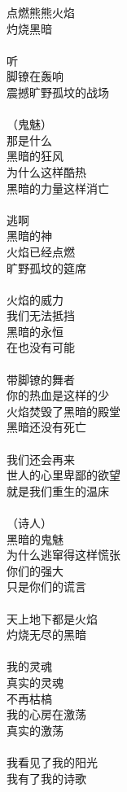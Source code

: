 点燃熊熊火焰\\
灼烧黑暗\\
\\
听\\
脚镣在轰响\\
震撼旷野孤坟的战场\\
\\
（鬼魅）\\
那是什么\\
黑暗的狂风\\
为什么这样酷热\\
黑暗的力量这样消亡\\
\\
逃啊\\
黑暗的神\\
火焰已经点燃\\
旷野孤坟的筵席\\
\\
火焰的威力\\
我们无法抵挡\\
黑暗的永恒\\
在也没有可能\\
\\
带脚镣的舞者\\
你的热血是这样的少\\
火焰焚毁了黑暗的殿堂\\
黑暗还没有死亡\\
\\
我们还会再来\\
世人的心里卑鄙的欲望\\
就是我们重生的温床\\
\\
（诗人）\\
黑暗的鬼魅\\
为什么逃窜得这样慌张\\
你们的强大\\
只是你们的谎言\\
\\
天上地下都是火焰\\
灼烧无尽的黑暗\\
\\
我的灵魂\\
真实的灵魂\\
不再枯槁\\
我的心房在激荡\\
真实的激荡\\
\\
我看见了我的阳光\\
我有了我的诗歌\\
\\
